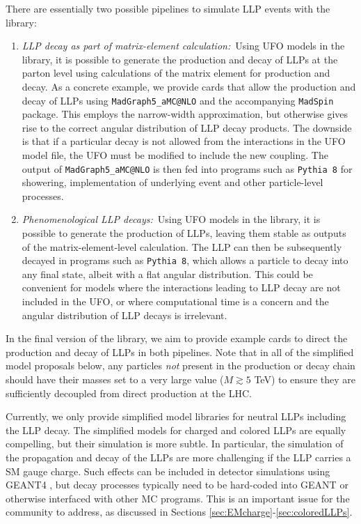 There are essentially two possible pipelines to simulate LLP events with the library:
%
\begin{enumerate}

\item \emph{LLP decay as part of matrix-element calculation:}~Using UFO models in the library, it is possible to generate the production and decay of LLPs at the parton level using calculations of the matrix element for production and decay. As a concrete example, we provide cards that allow the production and decay of LLPs using \texttt{MadGraph5\_aMC@}\texttt{NLO} \cite{Alwall:2014hca} and the accompanying  \texttt{MadSpin} \cite{Artoisenet:2012st} package. This employs the narrow-width approximation, but otherwise gives rise to the correct angular distribution of LLP decay products. The downside is that if a particular decay is not allowed from the interactions in the UFO model file, the UFO must be modified to include the new coupling. The output of \texttt{MadGraph5\_aMC@}\texttt{NLO} is then fed into programs such as \texttt{Pythia 8} \cite{Sjostrand:2007gs,Sjostrand:2014zea} for showering, implementation of underlying event and other particle-level processes.

\item \emph{Phenomenological LLP decays:}~Using UFO models in the library, it is possible to generate the production of LLPs, leaving them stable as outputs of the matrix-element-level calculation. The LLP can then be subsequently decayed in programs such as \texttt{Pythia 8}, which allows a particle to decay into any final state, albeit with a flat angular distribution. This could be convenient for models where the interactions leading to LLP decay are not included in the UFO, or where computational time is a concern and the angular distribution of LLP decays is irrelevant.

\end{enumerate}
%
In the final version of the library, we aim to provide example cards to direct the production and decay of LLPs in both pipelines. Note that in all of the simplified model proposals below, any particles \emph{not} present in the production or decay chain should have their masses set to a very large value ($M\gtrsim5$ TeV) to ensure they are sufficiently decoupled from direct production at the LHC.


Currently, we only provide simplified model libraries for neutral LLPs including the LLP decay. The simplified models for charged and colored LLPs are equally compelling, but their simulation is more subtle. In particular, the simulation of the propagation and decay of the LLPs are more challenging if the LLP carries a SM gauge charge. Such effects can be included in detector simulations using GEANT4 \cite{Agostinelli:2002hh}, but decay processes typically need to be hard-coded into GEANT or otherwise interfaced with other MC programs. This is an important issue for the community to address, as discussed in Sections \ref{sec:EMcharge}-\ref{sec:coloredLLPs}. 

